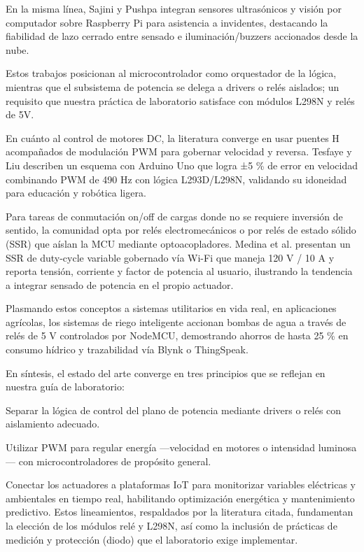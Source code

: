 \documentclass{article}
\begin{document}
En la misma línea, Sajini y Pushpa integran sensores ultrasónicos y visión por computador sobre Raspberry Pi para asistencia a invidentes, destacando la fiabilidad de lazo cerrado entre sensado e iluminación/buzzers accionados desde la nube. \cite{sajini2023proximity}

Estos trabajos posicionan al microcontrolador como orquestador de la lógica, mientras que el subsistema de potencia se delega a drivers o relés aislados; un requisito que nuestra práctica de laboratorio satisface con módulos L298N y relés de 5V.

En cuánto al control de motores DC, la literatura converge en usar puentes H acompañados de modulación PWM para gobernar velocidad y reversa. Tesfaye y Liu describen un esquema con Arduino Uno que logra ±5 \% de error en velocidad combinando PWM de 490 Hz con lógica L293D/L298N, validando su idoneidad para educación y robótica ligera. \cite{kaffale2025dcmotor}

Para tareas de conmutación on/off de cargas donde no se requiere inversión de sentido, la comunidad opta por relés electromecánicos o por relés de estado sólido (SSR) que aíslan la MCU mediante optoacopladores. Medina et al. presentan un SSR de duty-cycle variable gobernado vía Wi-Fi que maneja 120 V / 10 A y reporta tensión, corriente y factor de potencia al usuario, ilustrando la tendencia a integrar sensado de potencia en el propio actuador. \cite{medina2024ssr} 

Plasmando estos conceptos a sistemas utilitarios en vida real, en aplicaciones agrícolas, los sistemas de riego inteligente accionan bombas de agua a través de relés de 5 V controlados por NodeMCU, demostrando ahorros de hasta 25 \% en consumo hídrico y trazabilidad vía Blynk o ThingSpeak. \cite{muthekar2024smartirr}

En síntesis, el estado del arte converge en tres principios que se reflejan en nuestra guía de laboratorio:

Separar la lógica de control del plano de potencia mediante drivers o relés con aislamiento adecuado.

Utilizar PWM para regular energía —velocidad en motores o intensidad luminosa— con microcontroladores de propósito general.

Conectar los actuadores a plataformas IoT para monitorizar variables eléctricas y ambientales en tiempo real, habilitando optimización energética y mantenimiento predictivo. Estos lineamientos, respaldados por la literatura citada, fundamentan la elección de los módulos relé y L298N, así como la inclusión de prácticas de medición y protección (diodo) que el laboratorio exige implementar.
\end{document}
